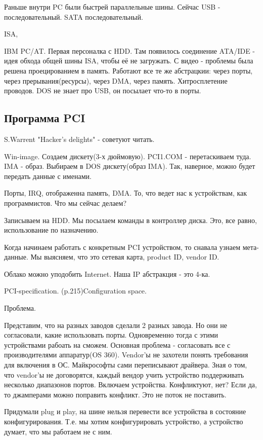 Раньше внутри PC были быстрей параллельные шины. Сейчас USB - последовательный. SATA последовательный. 

ISA, 

IBM PC/AT. Первая персоналка с HDD. Там появилось соединение ATA/IDE - идея обхода общей шины ISA, чтобы её не загружать. С видео - проблемы была решена проецированием в память. Работают все те же абстрацкии: через порты, через прерывания(ресурсы), через DMA, через память. Хитросплетение проводов. DOS не знает про USB, он посылает что-то в порты. 

\subsection{Программа PCI}
\begin{off}S.Warrent "Hacker's delights" - советуют читать.\end{off}

Win-image. Создаем дискету(3-х дюймовую). PCI1.COM - перетаскиваем туда. IMA - образ. Выбираем в DOS дискету(образ IMA). Так, наверное, можно будет передать данные с именами.

Порты, IRQ, отображенна память, DMA. То, что ведет нас к устройствам, как программистов. Что мы сейчас делаем? 

Записываем на HDD. Мы посылаем команды в контроллер диска. Это, все равно, использование по назначению.

Когда начинаем работать с конкретным PCI устройством, то снавала узнаем мета-данные.
Мы выясняем, что это сетевая карта, product ID, vendor ID.

Облако можно уподобить Internet. Наша IP абстракция - это 4-ка.

PCI-specification. (p.215)Configuration space.

Проблема.

Представим, что на разных заводов сделали 2 разных завода. Но они не согласовали, какие использовать порты. Одновременно тогда с этими устройствами рабоать на сможем. Основная проблема - согласовать все с производителями аппаратур(OS 360). Vendor'ы не захотели понять требования для включения в ОС. Майкрософты сами переписывают драйвера. Зная о том, что vendor'ы не договорятся, каждый вендор учить устройство поддерживать несколько диапазонов портов. Включаем устройства. Конфликтуют, нет? Если да, то джамперами можно поправить конфликт. Это не поток не поставить.

Придумали plug и play, на шине нельзя перевести все устройства в состояние конфигурирования. Т.е. мы хотим конфигурировать устройство, а устройство думает, что мы работаем не с ним. 

